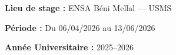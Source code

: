 \documentclass[12pt,a4paper]{report}
\begin{document}
\begin{titlepage}
    \vfill

    \begin{center}
        {\large \textbf{Lieu de stage :} ENSA Béni Mellal --- USMS\par}
        \vspace{0.1cm}
        {\large \textbf{Période :} Du 06/04/2026 au 13/06/2026\par}
        \vspace{0.1cm}
        {\large \textbf{Année Universitaire :} 2025--2026\par}
    \end{center}
\end{titlepage}

\clearpage
\thispagestyle{empty} 
\null
\clearpage

\setcounter{page}{1} %






\tableofcontents
\listoffigures
\listoftables



\clearpage
{}














\end{document}
